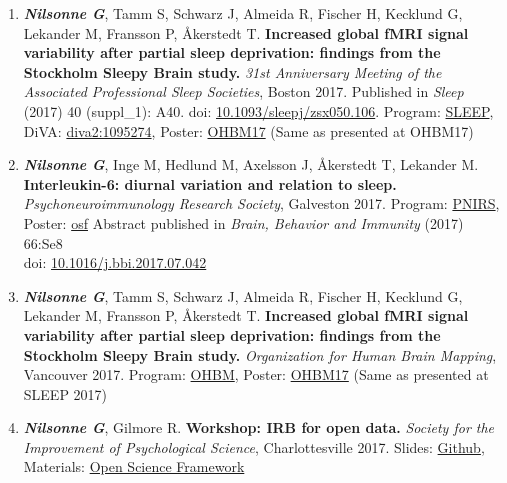 \documentclass[10pt]{article}
\begin{document}
\begin{enumerate}[nolistsep]
Program: \href{http://www.suhf.se/storage/ma/d3809593a7aa480e974101d18a93cbe9/15fb3e16f507402f9e4bd8b6858176be/pdf/C6D15F65C14989E82DAF8F21D9310860735D7050/Program\%20\%c3\%96ppen\%20vetenskap\%20170228.pdf}{suhf  .se}
\item \textbf{\textit{Nilsonne G}}, Tamm S, Schwarz J, Almeida R, Fischer H, Kecklund G, Lekander M, Fransson P, Åkerstedt T. \textbf{Increased global fMRI signal variability after partial sleep deprivation: findings from the Stockholm Sleepy Brain study.} \emph{31st Anniversary Meeting of the Associated Professional Sleep Societies}, Boston 2017. Published in \emph{Sleep} (2017) 40 (suppl\_1): A40. 
doi: \href{https://doi.org/10.1093/sleepj/zsx050.106}{10.1093/sleepj/zsx050.106}.
Program: \href{http://www.sleepmeeting.org/docs/default-source/attendee-documents/finalprogram_17.pdf?sfvrsn=2}{SLEEP}, DiVA: \href{http://urn.kb.se/resolve?urn=urn:nbn:se:su:diva-143110}{diva2:1095274}, Poster: \href{https://files.aievolution.com/hbm1701/abstracts/36492/1909_Nilsonne.pdf}{OHBM17} (Same as presented at OHBM17)
\item \textbf{\textit{Nilsonne G}}, Inge M, Hedlund M, Axelsson J, Åkerstedt T, Lekander M. \textbf{Interleukin-6: diurnal variation and relation to sleep.} \emph{Psychoneuroimmunology Research Society}, Galveston 2017. 
Program: \href{https://www.pnirs.org/resources/docs/PNIRS\%202017\%20Program\%20Final.pdf}{PNIRS}, Poster: \href{https://osf.io/kd53f/}{osf}
Abstract published in \emph{Brain, Behavior and Immunity} (2017) 66:Se8\\ 
doi: \href{http://doi.org/10.1016/j.bbi.2017.07.042}{10.1016/j.bbi.2017.07.042}
\item \textbf{\textit{Nilsonne G}}, Tamm S, Schwarz J, Almeida R, Fischer H, Kecklund G, Lekander M, Fransson P, Åkerstedt T. \textbf{Increased global fMRI signal variability after partial sleep deprivation: findings from the Stockholm Sleepy Brain study.} \emph{Organization for Human Brain Mapping}, Vancouver 2017. 
Program: \href{https://www.humanbrainmapping.org/files/2017/Program_Book_Final.pdf}{OHBM}, Poster: \href{https://files.aievolution.com/hbm1701/abstracts/36492/1909_Nilsonne.pdf}{OHBM17} (Same as presented at SLEEP 2017)
\item \textbf{\textit{Nilsonne G}}, Gilmore R. \textbf{Workshop: IRB for open data.} \emph{Society for the Improvement of Psychological Science}, Charlottesville  2017. 
Slides: \href{https://github.com/gilmore-lab/sips-2017-07-30/blob/master/index.Rmd}{Github}, Materials: \href{https://osf.io/9d5hr/}{Open Science Framework}

\end{enumerate}
\end{document}
